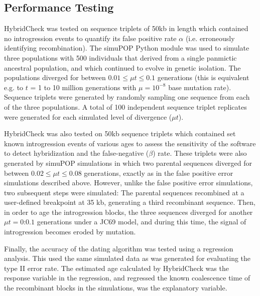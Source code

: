 \subsection{Performance Testing}
HybridCheck was tested on sequence triplets of 50kb in length which contained no introgression events to quantify its false positive rate $\alpha$ (i.e. erroneously identifying recombination). The simuPOP Python module \parencite{Peng2005} was used to simulate three populations with 500 individuals that derived from a single panmictic ancestral population, and which continued to evolve in genetic isolation. The populations diverged for between $0.01 \leq \mu t \leq 0.1$ generations (this is equivalent e.g. to $t$ = 1 to 10 million generations with $\mu=10^{-8}$ base mutation rate). Sequence triplets were generated by randomly sampling one sequence from each of the three populations.
A total of 100 independent sequence triplet replicates were generated for each simulated level of divergence ($\mu t$).

HybridCheck was also tested on 50kb sequence triplets which contained set known introgression events of various ages to assess the sensitivity of the software to detect hybridization and the false-negative ($\beta$) rate.
These triplets were also generated by simuPOP simulations in which two parental sequences diverged for between $0.02 \leq \mu t \leq 0.08$ generations, exactly as in the false positive error simulations described above. However, unlike the false positive error simulations, two subsequent steps were simulated: The parental sequences recombined at a user-defined breakpoint at 35 kb, generating a third recombinant sequence.
Then, in order to age the introgression blocks, the three sequences diverged for another $\mu t = 0$:$0.1$ generations under a JC69 model, and during this time, the signal of introgression becomes eroded by mutation.

Finally, the accuracy of the dating algorithm was tested using a regression analysis. This used the same simulated data as was generated for evaluating the type II error rate. The estimated age calculated by HybridCheck was the response variable in the regression, and regressed the known coalescence time of the recombinant blocks in the simulations, was the explanatory variable.


